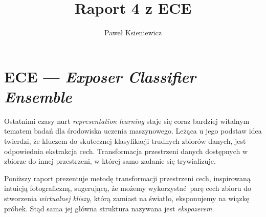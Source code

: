 \documentclass[]{article}
\title{Raport 4 z ECE}
\author{Paweł Ksieniewicz}
\begin{document}
\newenvironment{ride}[2]
{
	\caption{Zbiór \emph{#2}}
    \label{tab:results}
	\centering
	\begin{tabular}{lS>{\color{red}}S}
		\\\toprule{promień} & {accuracy} & {\textsc{bac}} \\\midrule
	    \csvreader[head to column names]{#1}{}%
	    {\radius & \accuracy & \bac\\}%
	\end{tabular}
	
	\begin{tikzpicture}
	\begin{axis}[
	    grid=both,
	    grid style={line width=.1pt, draw=gray!10},
	    major grid style={line width=.2pt,draw=gray!50},
	    width=6cm,
	    height=8cm,
	    xmin=0.01, xmax=0.29,
	    ymin=.0, ymax=1,
	    ytick = {.5, .6, .7, .8, .9, 1},
	    yticklabels = { ~, 60\%, ~, 80\%, ~, 100\%},
	    xtick = {0, .05, .1, 0.15, 0.2, 0.25},
		xticklabels = {~, 5,10,15,20,25},
		xlabel = Promień,
		minor tick num=2,
		xlabel style={font=\tiny,fill=white},
		ticklabel style={font=\tiny,fill=white}		]
		\addplot[color=black] table [x=radius, y=accuracy, col sep=comma] {#1};
		\addplot[color=red] table [x=radius, y=bac, col sep=comma] {#1};
	\end{axis}
	\end{tikzpicture}
}{}

\maketitle
\newpage

\section{ECE --- \emph{Exposer Classifier Ensemble}}

Ostatnimi czasy nurt \emph{representation learning} staje się coraz bardziej witalnym tematem badań dla środowiska uczenia maszynowego. Leżąca u jego podstaw idea twierdzi, że kluczem do skutecznej klasyfikacji trudnych zbiorów danych, jest odpowiednia ekstrakcja cech. Transformacja przestrzeni danych dostępnych w zbiorze do innej przestrzeni, w której samo zadanie się trywializuje. 

Poniższy raport prezentuje metodę transformacji przestrzeni cech, inspirowaną intuicją fotograficzną, sugerującą, że możemy wykorzystać parę cech zbioru do stworzenia \emph{wirtualnej kliszy}, którą zamiast na światło, eksponujemy na wiązkę próbek. Stąd sama jej główna struktura nazywana jest \emph{ekspozerem}.
\end{document}
